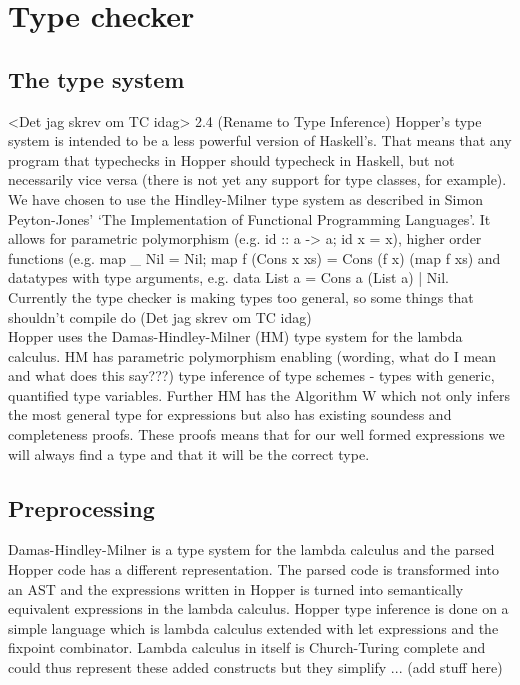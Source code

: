\section{Type checker}


\subsection{The type system}
<Det jag skrev om TC idag>
2.4 (Rename to Type Inference)
Hopper’s type system is intended to be a less powerful version of Haskell’s.  That means that any program that typechecks in Hopper should typecheck in Haskell, but not necessarily vice versa (there is not yet any support for type classes, for example).  We have chosen to use the Hindley-Milner type system as described in Simon Peyton-Jones’ ‘The Implementation of Functional Programming Languages’. It allows for parametric polymorphism (e.g. id :: a -> a; id x = x), higher order functions (e.g. map \_ Nil = Nil; map f (Cons x xs) = Cons (f x) (map f xs) and datatypes with type arguments, e.g. data List a = Cons a (List a) | Nil. Currently the type checker is making types too general, so some things that shouldn’t compile do
(Det jag skrev om TC idag)
\\
Hopper uses the Damas-Hindley-Milner (HM) type system for the lambda calculus. HM has parametric polymorphism enabling (wording, what do I mean and what does this say???) type inference of type schemes - types with generic, quantified type variables. Further HM has the Algorithm W which not only infers the most general type for expressions but also has existing soundess and completeness proofs. These proofs means that for our well formed expressions we will always find a type and that it will be the correct type.

\subsection{Preprocessing}

Damas-Hindley-Milner is a type system for the lambda calculus and the parsed Hopper code has a different representation. The parsed code is transformed into an AST and the expressions written in Hopper is turned into semantically equivalent expressions in the lambda calculus. Hopper type inference is done on a simple language which is lambda calculus extended with let expressions and the fixpoint combinator. Lambda calculus in itself is Church-Turing complete and could thus represent these added constructs but they simplify ... (add stuff here)

